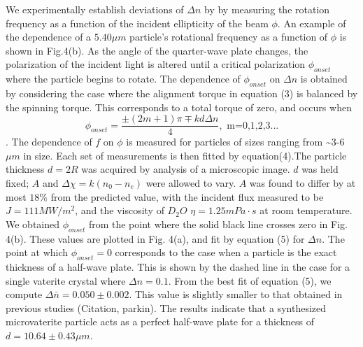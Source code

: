 \documentclass[12pt]{article}
\begin{document}
{We experimentally establish deviations of $\Delta n$ by by measuring the rotation frequency as a function of the incident ellipticity of the beam $\phi.$ An example of the dependence of a $5.40 \mu m$ particle's rotational frequency as a function of $\phi$ is shown in Fig.4(b). As the angle of the quarter-wave plate changes, the polarization of the incident light is altered until a critical polarization $\phi_{onset}$ where the particle begins to rotate. The dependence of  $\phi_{onset}$ on $\Delta n$ is obtained by considering the case where the alignment torque in equation (3) is balanced by the spinning torque. This corresponds to a total torque of zero, and occurs when 
\begin{equation}
\phi_{onset}=\frac{\pm(2m+1)\pi\mp kd\Delta n}{4} , \text{  m=0,1,2,3...}
\end{equation}. The dependence of $f$ on $\phi$ is measured for particles of sizes ranging from \textasciitilde 3-6$\mu m$ in size. Each set
of measurements is then fitted by equation(4).The particle thickness $d=2R$ was acquired by analysis of a microscopic image. $d$ was held fixed; $A$ and $\Delta\chi=k(n_{0}-n_{e})$ were allowed to vary. $A$ was found
to differ by at most $18\%$ from the predicted value, with the incident flux measured to be $J=111 MW/m^2$, and the viscosity of $D_{2}O$ $\eta=1.25mPa\cdot s$ at room temperature. We obtained $\phi_{onset}$ from the point where the solid black line crosses zero in Fig. 4(b). These values are plotted in Fig. 4(a), and fit by equation (5) for $\Delta n$. The point at which $\phi_{onset}=0$ corresponds to the case when a particle is the exact thickness of a half-wave plate. This is shown by the dashed line in the case for a single vaterite crystal where $\Delta n=0.1$.  From the best fit of equation (5), we compute $\Delta\bar{n}=0.050\pm 0.002$. This value is slightly smaller to that obtained in previous studies (Citation, parkin). The results indicate that a synthesized microvaterite particle acts as a perfect half-wave plate for a thickness of $d=10.64\pm 0.43 \mu m$.


}
\end{document}
